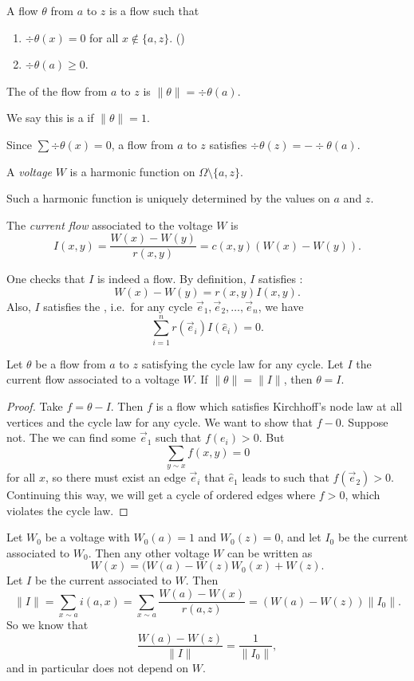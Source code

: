 \documentclass[a4paper]{article}
\begin{document}
\begin{defi}
  A flow $\theta$ from $a$ to $z$ is a flow such that
  \begin{enumerate}
    \item $\div \theta(x) = 0$ for all $x \not \in \{a, z\}$. \hfill ()
    \item $\div \theta(a) \geq 0$.
  \end{enumerate}
  The  of the flow from $a$ to $z$ is $\|\theta\| = \div \theta(a)$.\index{$\|\theta\|$}

  We say this is a  if $\|\theta\| = 1$.
\end{defi}
Since $\sum \div \theta(x) = 0$, a flow from $a$ to $z$ satisfies $\div \theta(z) = - \div \theta(a)$.

\begin{defi}[Voltage]
  A \emph{voltage} $W$ is a harmonic function on $\Omega \setminus \{a, z\}$.
\end{defi}
Such a harmonic function is uniquely determined by the values on $a$ and $z$.
\begin{defi}
  The \emph{current flow} associated to the voltage $W$ is
  \[
    I(x, y) = \frac{W(x) - W(y)}{r(x, y)} = c(x, y) (W(x) - W(y)).
  \]
\end{defi}
One checks that $I$ is indeed a flow. By definition, $I$ satisfies :
\[
  W(x) - W(y) = r(x, y) I(x, y).
\]
Also, $I$ satisfies the , i.e.\ for any cycle $\vec{e}_1, \vec{e}_2, \ldots, \vec{e}_n$, we have
\[
  \sum_{i = 1}^n r(\vec{e}_i) I (\hat{e}_i) = 0.
\]

\begin{prop}
  Let $\theta$ be a flow from $a$ to $z$ satisfying the cycle law for any cycle. Let $I$ the current flow associated to a voltage $W$. If $\|\theta\| = \|I\|$, then $\theta = I$.
\end{prop}

\begin{proof}
  Take $f = \theta - I$. Then $f$ is a flow which satisfies Kirchhoff's node law at all vertices and the cycle law for any cycle. We want to show that $f - 0$. Suppose not. The we can find some $\vec{e}_1$ such that $f(e_i) > 0$. But
  \[
    \sum_{y\sim x} f(x, y) = 0
  \]
  for all $x$, so there must exist an edge $\vec{e}_i$ that $\hat{e}_1$ leads to such that $f(\vec{e}_2) > 0$. Continuing this way, we will get a cycle of ordered edges where $f > 0$, which violates the cycle law.
\end{proof}
Let $W_0$ be a voltage with $W_0(a) = 1$ and $W_0(z) = 0$, and let $I_0$ be the current associated to $W_0$. Then any other voltage $W$ can be written as
\[
  W(x) = (W(a) - W(z) W_0(x) + W(z).
\]
Let $I$ be the current associated to $W$. Then
\[
  \|I\| = \sum_{x \sim a} i(a, x) = \sum_{x \sim a} \frac{W(a) - W(x)}{r(a, z)} = (W(a) - W(z)) \|I_0\|.
\]
So we know that
\[
  \frac{W(a) - W(z)}{\|I\|} = \frac{1}{\|I_0\|},
\]
and in particular does not depend on $W$.
\end{document}
